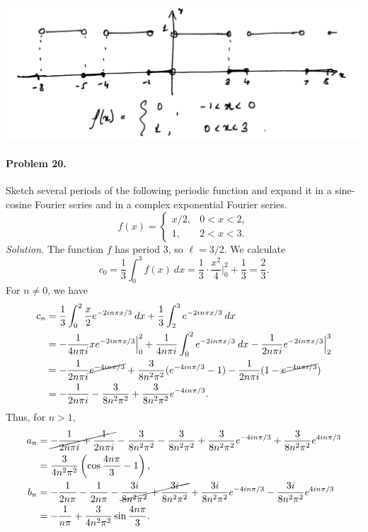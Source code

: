 \documentclass[10pt]{article}
\begin{document}
        \begin{center}
                \includegraphics[scale=0.4]{./6_17.png}
        \end{center}
        
        \paragraph{Problem 20.} Sketch several periods of the following periodic function and expand it in a sine-cosine Fourier series and in a 
        complex exponential Fourier series.
        \[
                f(x) = \begin{cases}
                        x/2, & 0 < x < 2, \\
                        1, & 2 < x < 3.
                \end{cases}
        \]
        \textit{Solution.} The function $f$ has period $3$, so $\ell = 3 /2$.
        We calculate
        \[
                c_0 = \frac{1}{3}\int_0^3 f(x)\:dx = \frac{1}{3}\cdot\frac{x^2}{4}\Bigg|_0^2 + \frac{1}{3} = \frac{2}{3}.
        \]
        For $n\neq 0$, we have
        \begin{align*}
        c_n &= \frac{1}{3}\int_0^2 \frac{x}{2}e^{-2in\pi x/3}\:dx + \frac{1}{3}\int_2^3 e^{-2in\pi x/3}\:dx \\
                &= -\frac{1}{4n\pi i}xe^{-2in\pi x/3}\Big|_0^2 + \frac{1}{4n\pi i}\int_0^2 e^{-2in\pi x/3}\:dx - 
                        \frac{1}{2n\pi i}e^{-2in\pi x/3}\Big|_2^3 \\
                &= -\frac{1}{2n\pi i}\cancel{e^{-4in\pi/3}} + \frac{3}{8n^2\pi^2}(e^{-4in\pi/3} - 1) - \frac{1}{2n\pi i}(1 - \cancel{e^{-4n\pi i/3}}) \\
                &= -\frac{1}{2n\pi i} - \frac{3}{8n^2\pi^2} + \frac{3}{8n^2\pi^2}e^{-4in\pi/3}. 
        \end{align*}
        Thus, for $n > 1$,
        \begin{align*}
                a_n &= \cancel{-\frac{1}{2n\pi i} + \frac{1}{2n\pi i}} - \frac{3}{8n^2\pi^2} - \frac{3}{8n^2\pi^2} + \frac{3}{8n^2\pi^2}e^{-4in\pi/3} 
                        + \frac{3}{8n^2\pi^2}e^{4in\pi/3} \\
                        &= \frac{3}{4n^2\pi^2}\left(\cos\frac{4n\pi}{3} - 1\right), \\
                b_n &= -\frac{1}{2n\pi} - \frac{1}{2n\pi} - \cancel{\frac{3i}{8n^2\pi^2} + \frac{3i}{8n^2\pi^2}} + \frac{3i}{8n^2\pi^2}e^{-4in\pi/3}
                        - \frac{3i}{8n^2\pi^2}e^{4in\pi/3} \\
                        &= -\frac{1}{n\pi} + \frac{3}{4n^2\pi^2}\sin\frac{4n\pi}{3}.
        \end{align*}
\end{document}
